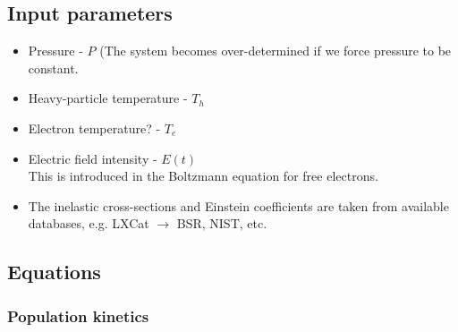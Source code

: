 




\subsection{Input parameters} \label{sec:input}
\begin{itemize}[noitemsep,topsep=1pt,parsep=1pt,partopsep=3pt]
    \item Pressure - $P$ (The system becomes over-determined if we force pressure to be constant. 
    \item Heavy-particle temperature - $T_h$
    \item Electron temperature? - $T_e$ \\
    \item Electric field intensity - $E(t)$  \\ This is introduced in the Boltzmann equation for free electrons.
    \item The inelastic cross-sections and Einstein coefficients are taken from available databases, e.g. LXCat $\rightarrow$ BSR, NIST, etc. 
\end{itemize}



\subsection{Equations} \label{sec:equations}


\subsubsection{Population kinetics} \label{sec:CRmodel}


